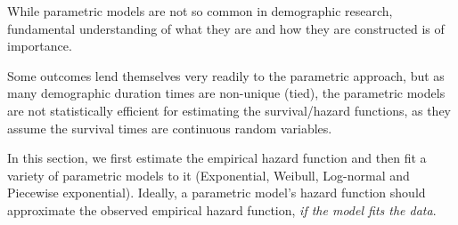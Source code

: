\documentclass[
]{article}
\newenvironment{Shaded}{\begin{snugshade}}{\end{snugshade}}
\newcommand{\CommentTok}[1]{\textcolor[rgb]{0.56,0.35,0.01}{\textit{#1}}}
\newcommand{\DataTypeTok}[1]{\textcolor[rgb]{0.13,0.29,0.53}{#1}}
\newcommand{\DecValTok}[1]{\textcolor[rgb]{0.00,0.00,0.81}{#1}}
\newcommand{\KeywordTok}[1]{\textcolor[rgb]{0.13,0.29,0.53}{\textbf{#1}}}
\newcommand{\NormalTok}[1]{#1}
\newcommand{\OperatorTok}[1]{\textcolor[rgb]{0.81,0.36,0.00}{\textbf{#1}}}
\newcommand{\StringTok}[1]{\textcolor[rgb]{0.31,0.60,0.02}{#1}}
\begin{document}
While parametric models are not so common in demographic research,
fundamental understanding of what they are and how they are constructed
is of importance.

Some outcomes lend themselves very readily to the parametric approach,
but as many demographic duration times are non-unique (tied), the
parametric models are not statistically efficient for estimating the
survival/hazard functions, as they assume the survival times are
continuous random variables.

In this section, we first estimate the empirical hazard function and
then fit a variety of parametric models to it (Exponential, Weibull,
Log-normal and Piecewise exponential). Ideally, a parametric model's
hazard function should approximate the observed empirical hazard
function, \emph{if the model fits the data}.

\begin{Shaded}
\end{Shaded}
\end{document}
